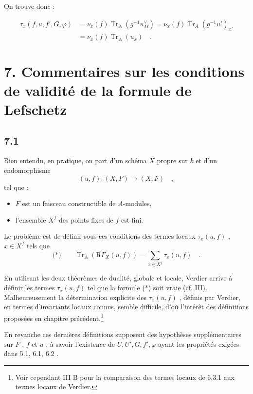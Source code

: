 \documentclass[11pt]{article}
\newcommand{\R}{\mathrm{R}}\newcommand{\RHomCore}{\mathrm{RHom}}
\providecommand{\Tr}{\operatorname{Tr}}
\providecommand{\Tr}{\operatorname{Tr}}
\providecommand{\Tr}{\operatorname{Tr}}
\providecommand{\R}{\mathrm R}
\providecommand{\Tr}{\operatorname{Tr}}
\providecommand{\Tr}{\operatorname{Tr}}
\begin{document}
On trouve donc :

\begin{equation}\tag{6.4.9}
\begin{aligned}
\tau_x(f,u, f', G, \varphi) &= \nu_x(f) \Tr_A(g^{-1}u_M^\vee) = \nu_x(f) \Tr_A(g^{-1}u')_{x'} \\
&= \nu_x(f) \Tr_A(u_x) \quad .
\end{aligned}
\end{equation}

\section*{7. Commentaires sur les conditions de validité de la formule de Lefschetz}

\subsection*{7.1}
Bien entendu, en pratique, on part d'un schéma $X$ propre sur $k$ et d'un endomorphisme
\[
(u, f) : (X, F) \longrightarrow (X, F) \quad ,
\]
tel que :
\begin{itemize}
\item $F$ est un faisceau constructible de $A$-modules,
\item l'ensemble $X^f$ des points fixes de $f$ est fini.
\end{itemize}

Le problème est de définir sous ces conditions des termes locaux $\tau_x(u, f)$ , $x \in X^f$ tels que
\[
\text{(*)} \qquad \Tr_A(\R\Gamma_X(u, f)) = \sum_{x \in X^f} \tau_x(u, f) \quad .
\]

En utilisant les deux théorèmes de dualité, globale et locale, Verdier arrive à définir les termes $\tau_x(u, f)$ tel que la formule (*) soit vraie (cf. III). Malheureusement la détermination explicite des $\tau_x(u, f)$ , définis par Verdier, en termes d'invariants locaux connus, semble difficile, d'où l'intérêt des définitions proposées en chapitre précédent.\footnote{Voir cependant III B pour la comparaison des termes locaux de 6.3.1 aux termes locaux de Verdier.}

En revanche ces dernières définitions supposent des hypothèses supplémentaires sur $F$ , $f$ et $u$ , à savoir l'existence de $U, U', G, f', \varphi$ ayant les propriétés exigées dans 5.1, 6.1, 6.2 .

\end{document}
